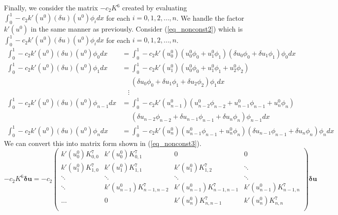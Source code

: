 \documentclass[11pt,fleqn]{article}
\theoremstyle{defstyle}
\begin{document}
Finally, we consider the matrix $-c_2K^6$ created by evaluating $\int_0^1 -c_2 k\prime(u^0)(\delta u )(u^0) \phi_i dx$ for each $i=0,1,2,...,n$. We handle the factor $k\prime(u^0)$ in the same manner as previously. Consider (\ref{eq_nonconst2}) which is $\int_0^1 -c_2 k\prime(u^0)(\delta u )(u^0) \phi_i dx$ for each $i=0,1,2,...,n$.
\begin{equation}
\begin{aligned}
\int_0^1 -c_2 k\prime(u^0)(\delta u )(u^0) \phi_0 dx &= \int_0^1 -c_2 k\prime(u^0_0)\left(u^0_0\phi_0 + u^0_1\phi_1 \right) \left(\delta u_0\phi_0 + \delta u_1\phi_1 \right) \phi_0 dx  \\
\int_0^1 -c_2 k\prime(u^0)(\delta u )(u^0) \phi_1 dx &= \int_0^1 -c_2 k\prime(u^0_1)\left(u^0_0\phi_0 + u^0_1\phi_1 + u^0_2\phi_2\right) \\ &~~~~~~ \left(\delta u_0\phi_0 + \delta u_1\phi_1 + \delta u_2\phi_2\right) \phi_1 dx \\
&~~~~\vdots \\
\int_0^1 -c_2 k\prime(u^0)(\delta u )(u^0) \phi_{n-1} dx &= \int_0^1 -c_2 k\prime(u^0_{n-1})\left(u^0_{n-2}\phi_{n-2} + u^0_{n-1}\phi_{n-1} + u^0_n\phi_n\right) \\ &~~~~~~\left(\delta u_{n-2}\phi_{n-2} + \delta u_{n-1}\phi_{n-1} + \delta u_n\phi_n\right) \phi_{n-1} dx \\
\int_0^1 -c_2 k\prime(u^0)(\delta u )(u^0) \phi_n dx &= \int_0^1 -c_2 k\prime(u^0_n)\left(u^0_{n-1}\phi_{n-1} + u^0_n\phi_n\right) \left(\delta u_{n-1}\phi_{n-1} + \delta u_n\phi_n\right) \phi_n dx
\end{aligned}
\label{eq_nonconst2}
\end{equation}
We can convert this into matrix form shown in (\ref{eq_nonconst3}).
\begin{equation}
-c_2K^6\mathbf{\delta u} = -c_2\begin{pmatrix}
k\prime(u^0_0)K^7_{0,0} & k\prime(u^0_0)K^7_{0,1} & 0 & 0 \\
k\prime(u^0_1)K^7_{1,0} & k\prime(u^0_1)K^7_{1,1} & k\prime(u^0_1)K^7_{1,2} & \ddots \\
 \ddots & \ddots & \ddots & \ddots \\
 \ddots & k\prime(u^0_{n-1})K^7_{n-1,n-2} & k\prime(u^0_{n-1})K^7_{n-1,n-1} & k\prime(u^0_{n-1})K^7_{n-1,n} \\
 \hdots & 0 & k\prime(u^0_{n})K^7_{n,n-1} & k\prime(u^0_{n}) K^7_{n,n}\\
\end{pmatrix}\mathbf{\delta u}
\label{eq_nonconst3}
\end{equation}
\end{document}
